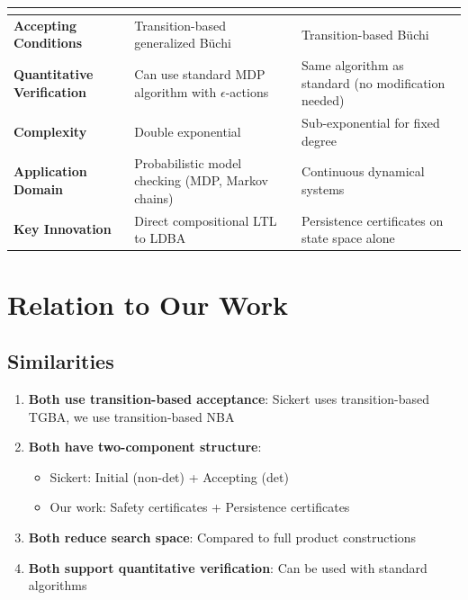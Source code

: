 \documentclass{article}
\begin{document}
\begin{center}
\begin{tabular}{|p{3.5cm}|p{5.5cm}|p{5.5cm}|}
\begin{itemize}
\end{itemize} \\
\hline
\textbf{Accepting Conditions} & Transition-based generalized Büchi & Transition-based Büchi \\
\hline
\textbf{Quantitative Verification} & Can use standard MDP algorithm with $\epsilon$-actions & Same algorithm as standard (no modification needed) \\
\hline
\textbf{Complexity} & Double exponential & Sub-exponential for fixed degree \\
\hline
\textbf{Application Domain} & Probabilistic model checking (MDP, Markov chains) & Continuous dynamical systems \\
\hline
\textbf{Key Innovation} & Direct compositional LTL to LDBA & Persistence certificates on state space alone \\
\hline
\end{tabular}
\end{center}

\section{Relation to Our Work}

\subsection{Similarities}

\begin{enumerate}
    \item \textbf{Both use transition-based acceptance}: Sickert uses transition-based TGBA, we use transition-based NBA

    \item \textbf{Both have two-component structure}:
    \begin{itemize}
        \item Sickert: Initial (non-det) + Accepting (det)
        \item Our work: Safety certificates + Persistence certificates
    \end{itemize}

    \item \textbf{Both reduce search space}: Compared to full product constructions

    \item \textbf{Both support quantitative verification}: Can be used with standard algorithms
\end{enumerate}
\end{document}
